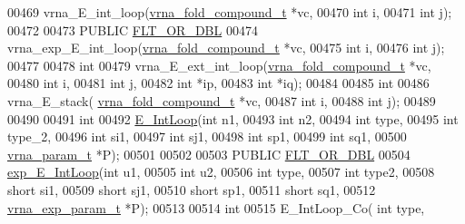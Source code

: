 \begin{DoxyCode}
00469 vrna\_E\_int\_loop(\hyperlink{group__fold__compound_structvrna__fc__s}{vrna\_fold\_compound\_t} *vc,
00470                 \textcolor{keywordtype}{int} i,
00471                 \textcolor{keywordtype}{int} j);
00472 
00473 PUBLIC \hyperlink{group__data__structures_ga31125aeace516926bf7f251f759b6126}{FLT\_OR\_DBL}
00474 vrna\_exp\_E\_int\_loop(\hyperlink{group__fold__compound_structvrna__fc__s}{vrna\_fold\_compound\_t} *vc,
00475                 \textcolor{keywordtype}{int} i,
00476                 \textcolor{keywordtype}{int} j);
00477 
00478 \textcolor{keywordtype}{int}
00479 vrna\_E\_ext\_int\_loop(\hyperlink{group__fold__compound_structvrna__fc__s}{vrna\_fold\_compound\_t} *vc,
00480                     \textcolor{keywordtype}{int} i,
00481                     \textcolor{keywordtype}{int} j,
00482                     \textcolor{keywordtype}{int} *ip,
00483                     \textcolor{keywordtype}{int} *iq);
00484 
00485 \textcolor{keywordtype}{int}
00486 vrna\_E\_stack( \hyperlink{group__fold__compound_structvrna__fc__s}{vrna\_fold\_compound\_t} *vc,
00487               \textcolor{keywordtype}{int} i,
00488               \textcolor{keywordtype}{int} j);
00489 
00490 
00491 \textcolor{keywordtype}{int}
00492 \hyperlink{group__loops_ga0266d2c7a6098259280fb97e9f980b34}{E\_IntLoop}(\textcolor{keywordtype}{int} n1,
00493           \textcolor{keywordtype}{int} n2,
00494           \textcolor{keywordtype}{int} type,
00495           \textcolor{keywordtype}{int} type\_2,
00496           \textcolor{keywordtype}{int} si1,
00497           \textcolor{keywordtype}{int} sj1,
00498           \textcolor{keywordtype}{int} sp1,
00499           \textcolor{keywordtype}{int} sq1,
00500           \hyperlink{group__energy__parameters_structvrna__param__s}{vrna\_param\_t} *P);
00501 
00502 
00503 PUBLIC \hyperlink{group__data__structures_ga31125aeace516926bf7f251f759b6126}{FLT\_OR\_DBL}
00504 \hyperlink{group__loops_ga34e8abb9e1b54fab38524fb20214a43e}{exp\_E\_IntLoop}(\textcolor{keywordtype}{int} u1,
00505               \textcolor{keywordtype}{int} u2,
00506               \textcolor{keywordtype}{int} type,
00507               \textcolor{keywordtype}{int} type2,
00508               \textcolor{keywordtype}{short} si1,
00509               \textcolor{keywordtype}{short} sj1,
00510               \textcolor{keywordtype}{short} sp1,
00511               \textcolor{keywordtype}{short} sq1,
00512               \hyperlink{group__energy__parameters_structvrna__exp__param__s}{vrna\_exp\_param\_t} *P);
00513 
00514 \textcolor{keywordtype}{int}
00515 E\_IntLoop\_Co( \textcolor{keywordtype}{int} type,

\end{DoxyCode}
